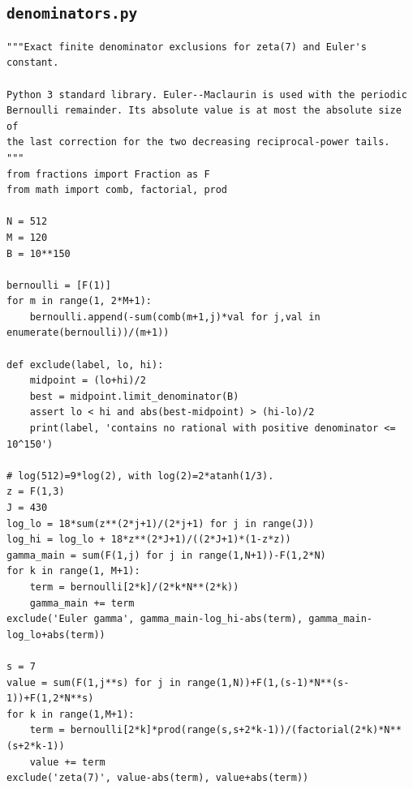\documentclass[11pt,a4paper]{article}
\begin{document}
\subsection*{\texttt{denominators.py}}
\begin{Verbatim}[fontsize=\footnotesize,breakanywhere=false]
"""Exact finite denominator exclusions for zeta(7) and Euler's constant.

Python 3 standard library. Euler--Maclaurin is used with the periodic
Bernoulli remainder. Its absolute value is at most the absolute size of
the last correction for the two decreasing reciprocal-power tails.
"""
from fractions import Fraction as F
from math import comb, factorial, prod

N = 512
M = 120
B = 10**150

bernoulli = [F(1)]
for m in range(1, 2*M+1):
    bernoulli.append(-sum(comb(m+1,j)*val for j,val in enumerate(bernoulli))/(m+1))

def exclude(label, lo, hi):
    midpoint = (lo+hi)/2
    best = midpoint.limit_denominator(B)
    assert lo < hi and abs(best-midpoint) > (hi-lo)/2
    print(label, 'contains no rational with positive denominator <= 10^150')

# log(512)=9*log(2), with log(2)=2*atanh(1/3).
z = F(1,3)
J = 430
log_lo = 18*sum(z**(2*j+1)/(2*j+1) for j in range(J))
log_hi = log_lo + 18*z**(2*J+1)/((2*J+1)*(1-z*z))
gamma_main = sum(F(1,j) for j in range(1,N+1))-F(1,2*N)
for k in range(1, M+1):
    term = bernoulli[2*k]/(2*k*N**(2*k))
    gamma_main += term
exclude('Euler gamma', gamma_main-log_hi-abs(term), gamma_main-log_lo+abs(term))

s = 7
value = sum(F(1,j**s) for j in range(1,N))+F(1,(s-1)*N**(s-1))+F(1,2*N**s)
for k in range(1,M+1):
    term = bernoulli[2*k]*prod(range(s,s+2*k-1))/(factorial(2*k)*N**(s+2*k-1))
    value += term
exclude('zeta(7)', value-abs(term), value+abs(term))
\end{Verbatim}
\end{document}
